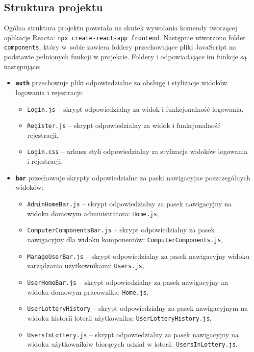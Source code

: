 \subsection{Struktura projektu}
Ogólna struktura projektu powstała na skutek wywołania komendy tworzącej aplikacje Reacta: \texttt{npx create-react-app frontend}. Następnie utworzono folder \texttt{components}, który w~sobie zawiera foldery przechowujące pliki JavaScript na podstawie pełnionych funkcji w projekcie. Foldery i odpowiadające im funkcje są następujące: 
\begin {itemize}
\item \texttt{\textbf{auth}} przechowuje pliki odpowiedzialne za obsługę i stylizacje widoków logowania i rejestracji:
	\begin{itemize}
	\item \texttt{Login.js} -- skrypt odpowiedzialny za widok i funkcjonalność logowania,
	\item \texttt{Register.js} -- skrypt odpowiedzialny za widok i funkcjonalność rejestracji,
	\item \texttt{Login.css} -- arkusz styli odpowiedzialny za stylizacje widoków logowania i rejestracji.
	\end{itemize}
\item \texttt{\textbf{bar}} przechowuje skrypty odpowiedzialne za paski nawigacyjne poszczególnych widoków:
	\begin{itemize}
	\item \texttt{AdminHomeBar.js} -- skrypt odpowiedzialny za pasek nawigacyjny na widoku domowym administratora: \texttt{Home.js},
	\item \texttt{ComputerComponentsBar.js} -- skrypt odpowiedzialny za pasek nawigacyjny dla widoku komponentów: \texttt{ComputerComponents.js},
	\item \texttt{ManageUserBar.js} -- skrypt odpowiedzialny za pasek nawigacyjny widoku zarządzania użytkownikami: \texttt{Users.js},
	\item \texttt{UserHomeBar.js} -- skrypt odpowiedzialny za pasek nawigacyjny na widoku domowym pracownika: \texttt{Home.js},
	\item \texttt{UserLotteryHistory} -- skrypt odpowiedzialny za pasek nawigacyjnym na widoku historii loterii użytkownika: \texttt{UserLotteryHistory.js},
	\item \texttt{UsersInLottery.js} -- skrypt odpowiedzialny za pasek nawigacyjny na widoku użytkowników biorących udział w loterii: \texttt{UsersInLottery.js}.
	\end{itemize}

\end{itemize}

